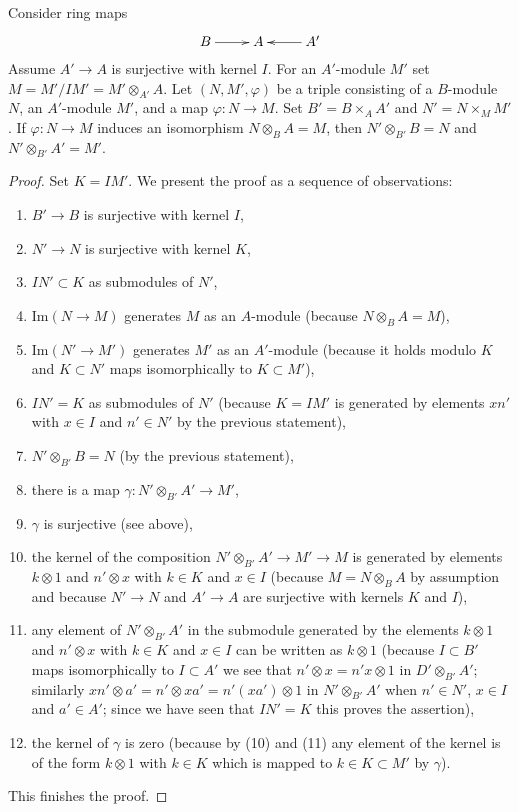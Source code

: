 \begin{lemma}
\label{lemma-module-over-fibre-product-rings}
Consider ring maps
$$
\xymatrix{
B \ar[r] & A & A' \ar[l]
}
$$
Assume $A' \to A$ is surjective with kernel $I$. For an $A'$-module $M'$
set $M = M'/IM' = M' \otimes_{A'} A$. Let $(N, M', \varphi)$
be a triple consisting of a $B$-module $N$, an $A'$-module $M'$, and
a map $\varphi : N \to M$. Set $B' = B \times_A A'$ and $N' = N \times_M M'$.
If $\varphi : N \to M$ induces an isomorphism $N \otimes_B A = M$, then
$N' \otimes_{B'} B = N$ and $N' \otimes_{B'} A' = M'$.
\end{lemma}

\begin{proof}
Set $K = IM'$. We present the proof as a sequence of observations:
\begin{enumerate}
\item $B' \to B$ is surjective with kernel $I$,
\item $N' \to N$ is surjective with kernel $K$,
\item $IN' \subset K$ as submodules of $N'$,
\item $\text{Im}(N \to M)$ generates $M$ as an $A$-module
(because $N \otimes_B A = M$),
\item $\text{Im}(N' \to M')$ generates $M'$ as an $A'$-module
(because it holds modulo $K$ and $K \subset N'$ maps
isomorphically to $K \subset M'$),
\item $IN' = K$ as submodules of $N'$ (because $K = IM'$ is generated
by elements $xn'$ with $x \in I$ and $n' \in N'$ by the previous statement),
\item $N' \otimes_{B'} B = N$ (by the previous statement),
\item there is a map $\gamma : N' \otimes_{B'} A' \to M'$,
\item $\gamma$ is surjective (see above),
\item the kernel of the composition $N' \otimes_{B'} A' \to M' \to M$ 
is generated by elements $k \otimes 1$ and $n' \otimes x$ with
$k \in K$ and $x \in I$ (because $M = N \otimes_B A$ by assumption
and because $N' \to N$ and $A' \to A$ are surjective with kernels
$K$ and $I$),
\item any element of $N' \otimes_{B'} A'$ in the submodule generated
by the elements $k \otimes 1$ and $n' \otimes x$ with
$k \in K$ and $x \in I$ can be written as $k \otimes 1$ (because
$I \subset B'$ maps isomorphically to $I \subset A'$ we see
that $n' \otimes x = n'x \otimes 1$ in $D' \otimes_{B'} A'$;
similarly $x n' \otimes a' = n' \otimes xa' = n'(xa') \otimes 1$
in $N' \otimes_{B'} A'$ when $n' \in N'$, $x \in I$ and $a' \in A'$;
since we have seen that $IN' = K$ this proves the assertion),
\item the kernel of $\gamma$ is zero (because by (10) and (11) any element of
the kernel is of the form $k \otimes 1$ with $k \in K$ which
is mapped to $k \in K \subset M'$ by $\gamma$).
\end{enumerate}
This finishes the proof.
\end{proof}

